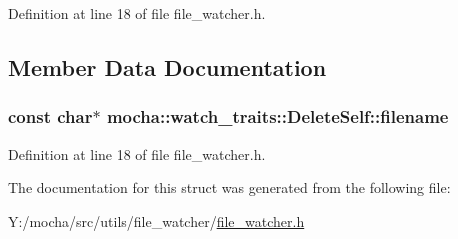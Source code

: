 Definition at line 18 of file file\_\-watcher.h.



\subsection{Member Data Documentation}
\hypertarget{structmocha_1_1watch__traits_1_1_delete_self_a3a119ba547d18117703400504e5e268e}{
\subsubsection[{filename}]{\setlength{\rightskip}{0pt plus 5cm}const char$\ast$ {\bf mocha::watch\_\-traits::DeleteSelf::filename}}}
\label{structmocha_1_1watch__traits_1_1_delete_self_a3a119ba547d18117703400504e5e268e}


Definition at line 18 of file file\_\-watcher.h.



The documentation for this struct was generated from the following file:\begin{DoxyCompactItemize}
\item 
Y:/mocha/src/utils/file\_\-watcher/\hyperlink{file__watcher_8h}{file\_\-watcher.h}\end{DoxyCompactItemize}

